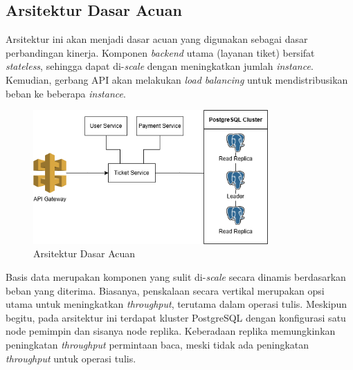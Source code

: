\subsection{Arsitektur Dasar Acuan}

Arsitektur ini akan menjadi dasar acuan yang digunakan sebagai dasar perbandingan kinerja. Komponen \textit{backend} utama (layanan tiket) bersifat \textit{stateless}, sehingga dapat di-\textit{scale} dengan meningkatkan jumlah \textit{instance}. Kemudian, gerbang API akan melakukan \textit{load balancing} untuk mendistribusikan beban ke beberapa \textit{instance}.

\begin{figure}[htbp]
    \centering
    \includegraphics[width=0.8\textwidth]{resources/appendix/architecture-reference.png}
    \caption{Arsitektur Dasar Acuan}
    \label{fig:baseline-architecture}
\end{figure}

Basis data merupakan komponen yang sulit di-\textit{scale} secara dinamis berdasarkan beban yang diterima. Biasanya, penskalaan secara vertikal merupakan opsi utama untuk meningkatkan \textit{throughput}, terutama dalam operasi tulis. Meskipun begitu, pada arsitektur ini terdapat kluster PostgreSQL dengan konfigurasi satu node pemimpin dan sisanya node replika. Keberadaan replika memungkinkan peningkatan \textit{throughput} permintaan baca, meski tidak ada peningkatan \textit{throughput} untuk operasi tulis.